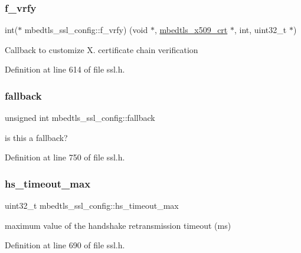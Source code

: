 \subsubsection{\texorpdfstring{f\+\_\+vrfy}{f\_vrfy}}
{\footnotesize\ttfamily int($\ast$ mbedtls\+\_\+ssl\+\_\+config\+::f\+\_\+vrfy) (void $\ast$, \mbox{\hyperlink{structmbedtls__x509__crt}{mbedtls\+\_\+x509\+\_\+crt}} $\ast$, int, uint32\+\_\+t $\ast$)}

Callback to customize X. certificate chain verification 

Definition at line 614 of file ssl.\+h.

\mbox{\label{structmbedtls__ssl__config_a0ca184f6088f938d7240157e8b4bbbab}} 
\subsubsection{\texorpdfstring{fallback}{fallback}}
{\footnotesize\ttfamily unsigned int mbedtls\+\_\+ssl\+\_\+config\+::fallback}

is this a fallback? 

Definition at line 750 of file ssl.\+h.

\mbox{\label{structmbedtls__ssl__config_af44d9c59c9255186e2a00f44e0678fac}} 
\subsubsection{\texorpdfstring{hs\+\_\+timeout\+\_\+max}{hs\_timeout\_max}}
{\footnotesize\ttfamily uint32\+\_\+t mbedtls\+\_\+ssl\+\_\+config\+::hs\+\_\+timeout\+\_\+max}

maximum value of the handshake retransmission timeout (ms) 

Definition at line 690 of file ssl.\+h.

\mbox{\label{structmbedtls__ssl__config_a28320f7be718c8f4197ee146dfdc2447}} 
